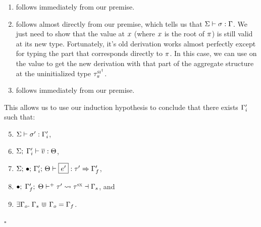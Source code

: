 \vspace{0.5em}

\begin{enumerate}
\item follows immediately from our premise.
\item follows almost directly from our premise, which tells us that
  $\oxstorevalidity{\oxglobalctx}{\oxvarctx}{\oxstore}$.
  We just need to show that the value at $\oxid$ (where $\oxid$ is the root of
  $\oxplace$) is still valid at its new type. Fortunately, it's old derivation
  works almost perfectly except for typing the part that corresponds directly to
  $\oxplace$. In this case, we can use  on the value to get the
  new derivation with that part of the aggregate structure at the uninitialized
  type $\oxsidtype_\oxplace$.
\item follows immediately from our premise.
\end{enumerate}

\vspace{0.5em}

This allows us to use our induction hypothesis to conclude that there exists
$\oxvarctx^\prime_i$ such that:
\begin{enumerate}
  \setcounter{enumi}{4}
\item $\oxstorevalidity{\oxglobalctx}{\oxvarctx^\prime_i}{\oxstore^\prime}$,
\item $\oxwfkontctx{\oxglobalctx}{\oxvarctx^\prime_i}{\overline{\oxvalue}}{\oxkontctx}$,
\item $\oxtypjudge{\oxglobalctx}{\oxemptyctx}{\oxkontctx}{\oxvarctx^\prime_i}
  {\oxexpr^\prime}{\oxtype^\prime}{\oxvarctx_f^\prime}$,
\item $\oxtunify[\oxcombine]{\oxemptyctx}{\oxkontctx}{\oxvarctx_f^\prime}
  {\oxtype^\prime}{\oxsxtype}{\oxvarctx_s}$, and
\item $\exists \oxvarctx_o. \; \oxvarctx_s \oxintersect \oxvarctx_o = \oxvarctx_f$.
\end{enumerate}
\hfill$\square$


